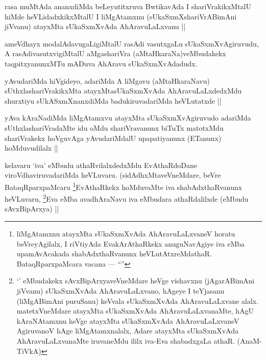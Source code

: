 \begin{artha}
rasa muMtAda ananxdiMda beLeyutitxruva BwtikavAda I shariVrakikxMtalU hiMde heVLidadxkikxMtalU I liMgAtamxnu (sUkaSxmXshariVrABimAni jiVvanu) atayxMta sUkaSxmXvAda AhAravuLaLxvanu ||
\end{artha}


\begin{artha}
ameVdhayx modalAdavugaLigiMtalU rasAdi vasutxgaLu sUkaSxmXvAgiruvudu, A rasAdivasutxvigiMtalU aMgashariVra (aMtaHkaraNa)veMbudakekx taqpitxyanunxMTu mADuva AhAravu sUkaSxmXvAdadudx.
\end{artha}

\begin{artha}
yAvudariMda hiVgideyo, adariMda A liMgavu (aMtaHkaraNavu) sUthxlashariVrakikxMta atayxMtasUkaSxmXvAda AhAravuLaLxdedxMdu shurxtiyu sUkASxmXnanxdiMda badukiruvadariMda heVLutatxde ||
\end{artha}

\begin{artha}
yAva kAraNadiMda liMgAtamxvu atayxMta sUkaSxmXvAgiruvudo adariMda sUthxlashariVradaMte idu oMdu shariVravanunx biTuTx matotxMdu shariVrakekx hoVguvAga yAvudariMdalU upapatiyanunx (ETanunx) hoMduvudilalx ||
\end{artha}


\begin{artha}
kelavaru `iva' eMbudu athaRvilalxdedxMdu EvAthaRdoDane viroVdhaviruvadariMda heVLuvaru. (sidAdhxMtaveVneMdare, beVre BataqRparxpaMcaru \footnote{liMgAtamxnu atayxMta sUkaSxmXvAda AhAravuLaLxvaneV horatu beVreyAgilalx, I riVtiyAda EvakArAthaRkekx anuguNavAgiye iva eMba upamAvAcakada shabAdxthaRvanunx heVLutAtxreMdathaR. BataqRparxpaMcara vacana --- ``\stext''}EvAthaRkekx hoMduvaMte iva shabAdxthaRvanunx heVLuvaru, \footnote{`\stext' eMbudakekx sAvxBipArxyaveVneMdare heVge vishavxnu (jAgarABimAni jiVvanu) sUkaSxmXvAda AhAravuLaLxvano, hAgeye I teYjasanu (liMgABimAni puruSanu) keVvala sUkaSxmXvAda AhAravuLaLxvane alalx. matetxVneMdare atayxMta sUkaSxmXvAda AhAravuLaLxvanaMte, hAgU kAraNAtamxnu heVge atayxMta sUkaSxmXvAda AhAravuLaLxvaneV AgiruvanoV hAge liMgAtamxnalalx, Adare atayxMta sUkaSxmXvAda AhAravuLaLxvanaMte iruvaneMdu ililx iva-Eva shabadxgaLa athaR. (AnaM-TiVkA)}Eva eMba avadhAraNavu iva eMbudara athaRdalilxde (eMbudu sAvxBipArxya) ||
\end{artha}

